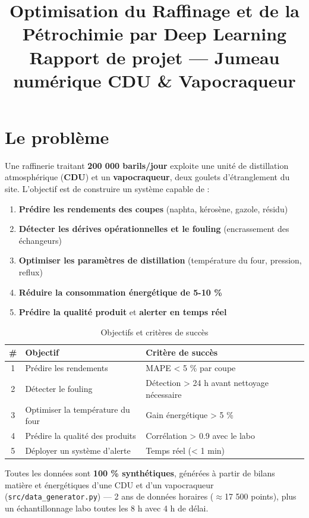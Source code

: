 \documentclass[11pt]{article}
\title{\textbf{Optimisation du Raffinage et de la Pétrochimie par Deep Learning}\\
\large Rapport de projet — Jumeau numérique CDU \& Vapocraqueur}
\author{}
\date{}
\begin{document}
\maketitle
\thispagestyle{fancy}

\section{Le problème}

Une raffinerie traitant \textbf{200 000 barils/jour} exploite une unité de distillation
atmosphérique (\textbf{CDU}) et un \textbf{vapocraqueur}, deux goulets d'étranglement du site.
L'objectif est de construire un système capable de :

\begin{enumerate}
  \item \textbf{Prédire les rendements des coupes} (naphta, kérosène, gazole, résidu)
  \item \textbf{Détecter les dérives opérationnelles et le fouling} (encrassement des échangeurs)
  \item \textbf{Optimiser les paramètres de distillation} (température du four, pression, reflux)
  \item \textbf{Réduire la consommation énergétique de 5-10 \%}
  \item \textbf{Prédire la qualité produit} et \textbf{alerter en temps réel}
\end{enumerate}

\begin{table}[h]
\centering
\begin{tabular}{clll}
\toprule
\# & Objectif & Critère de succès \\
\midrule
1 & Prédire les rendements & MAPE < 5 \% par coupe \\
2 & Détecter le fouling & Détection > 24 h avant nettoyage nécessaire \\
3 & Optimiser la température du four & Gain énergétique > 5 \% \\
4 & Prédire la qualité des produits & Corrélation > 0.9 avec le labo \\
5 & Déployer un système d'alerte & Temps réel (< 1 min) \\
\bottomrule
\end{tabular}
\caption{Objectifs et critères de succès}
\end{table}

Toutes les données sont \textbf{100 \% synthétiques}, générées à partir de bilans matière et
énergétiques d'une CDU et d'un vapocraqueur (\texttt{src/data\_generator.py}) — 2 ans de données
horaires ($\approx$17 500 points), plus un échantillonnage labo toutes les 8 h avec 4 h de délai.
\end{document}
